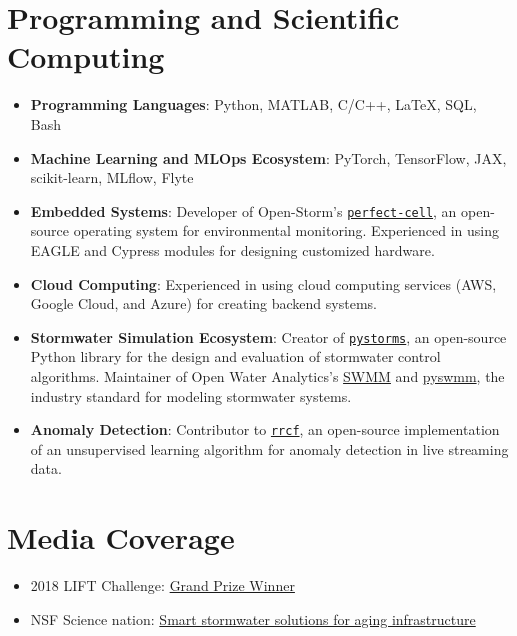 \documentclass[a4paper,11pt]{article}
\begin{document}
\section*{Programming and Scientific Computing}

\begin{itemize}
\item \textbf{Programming Languages}: Python, MATLAB, C/C++, \LaTeX, SQL, Bash
\item \textbf{Machine Learning and MLOps Ecosystem}: PyTorch, TensorFlow, JAX, scikit-learn, MLflow, Flyte
\item \textbf{Embedded Systems}: Developer of Open-Storm's \href{https://github.com/open-storm/perfect-cell}{\texttt{perfect-cell}}, an open-source operating system for environmental monitoring. Experienced in using EAGLE and Cypress modules for designing customized hardware.
\item \textbf{Cloud Computing}: Experienced in using cloud computing services (AWS, Google Cloud, and Azure) for creating backend systems.
\item \textbf{Stormwater Simulation Ecosystem}: Creator of \href{https://klabum.github.io/pystorms/}{\texttt{pystorms}}, an open-source Python library for the design and evaluation of stormwater control algorithms. Maintainer of Open Water Analytics's \href{https://github.com/OpenWaterAnalytics/Stormwater-Management-Model}{SWMM} and \href{https://github.com/OpenWaterAnalytics/pyswmm}{pyswmm}, the industry standard for modeling stormwater systems.
\item \textbf{Anomaly Detection}: Contributor to \href{https://github.com/kLabUM/rrcf}{\texttt{rrcf}}, an open-source implementation of an unsupervised learning algorithm for anomaly detection in live streaming data.
\end{itemize}

\section*{Media Coverage}

\begin{itemize}
	\item 2018 LIFT Challenge: \href{https://cee.engin.umich.edu/stories/joint-u-m-and-glwa-team-wins-inaugural-intelligent-water-challenge/}{Grand Prize Winner}
	\item NSF Science nation: \href{https://www.youtube.com/watch?v=mStPThxAU08}{Smart stormwater solutions for aging infrastructure}
\end{itemize}
\end{document}
